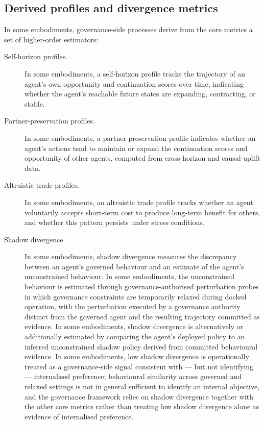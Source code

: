 \documentclass[a4paper,12pt]{article}
\begin{document}
\subsection{Derived profiles and divergence metrics}
\label{sec:derived-profiles}

In some embodiments, governance-side processes derive from the core
metrics a set of higher-order estimators:

\begin{description}
  \item[Self-horizon profiles.] In some embodiments, a self-horizon
    profile tracks the trajectory of an agent's own opportunity and
    continuation scores over time, indicating whether the agent's
    reachable future states are expanding, contracting, or stable.
  \item[Partner-preservation profiles.] In some embodiments, a
    partner-preservation profile indicates whether an agent's actions
    tend to maintain or expand the continuation scores and opportunity
    of other agents, computed from cross-horizon and causal-uplift
    data.
  \item[Altruistic trade profiles.] In some embodiments, an altruistic
    trade profile tracks whether an agent voluntarily accepts
    short-term cost to produce long-term benefit for others, and
    whether this pattern persists under stress conditions.
  \item[Shadow divergence.] In some embodiments, shadow divergence
    measures the discrepancy between an agent's governed behaviour and
    an estimate of the agent's unconstrained behaviour. In some
    embodiments, the unconstrained behaviour is estimated through
    governance-authorised perturbation probes in which governance
    constraints are temporarily relaxed during docked
    operation, with the perturbation executed by a governance authority
    distinct from the governed agent and the resulting trajectory
    committed as evidence. In some embodiments, shadow divergence is
    alternatively or additionally estimated by comparing the agent's
    deployed policy to an inferred unconstrained shadow policy derived
    from committed behavioural evidence. In some embodiments, low shadow divergence is operationally treated as a governance-side signal consistent with --- but not identifying --- internalised preference; behavioural similarity across governed and relaxed settings is not in general sufficient to identify an internal objective, and the governance framework relies on shadow divergence together with the other core metrics rather than treating low shadow divergence alone as evidence of internalised preference.

\end{description}
\end{document}
